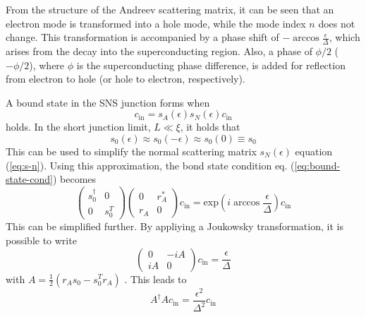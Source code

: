 From the structure of the Andreev scattering matrix, it can be seen that an electron mode is transformed into a hole mode, while the mode index $n$ does not change. This transformation is accompanied by a phase shift of $- \arccos \frac{\epsilon}{\Delta} $, which arises from the decay into the superconducting region. Also, a phase of $\phi/2$ ($-\phi/2$), where $\phi$ is the superconducting phase difference, is added for reflection from electron to hole (or hole to electron, respectively).

A bound state in the SNS junction forms when 
\begin{equation}
c_\text{in} = s_A ( \epsilon ) s_N ( \epsilon ) c_\text{in} \label{eq:bound-state-cond}
\end{equation}
holds. In the short junction limit, $L \ll \xi$, it holds that
\begin{equation}
s_0 ( \epsilon ) \approx s_0 ( - \epsilon ) \approx s_0 ( 0) \equiv s_0
\end{equation}
This can be used to simplify the normal scattering matrix $s_N (\epsilon) $ equation (\ref{eq:s-n}). Using this approximation, the bond state condition eq. (\ref{eq:bound-state-cond}) becomes
\begin{equation}
\begin{pmatrix} s_0^\dagger & 0\\ 0 & s_0^T \end{pmatrix}  \begin{pmatrix} 0 & r_A^* \\ r_A & 0 \end{pmatrix}  c_\text{in} = \text{exp} \left( i \arccos \frac{\epsilon}{\Delta} \right) c_\text{in}
\end{equation}
This can be simplified further. By appliying a Joukowsky transformation, it is possible to write
\begin{equation}
\begin{pmatrix} 0 & - i A \\ i A & 0 \end{pmatrix} c_\text{in} = \frac{\epsilon}{\Delta}
\end{equation}
with $A = \frac{1}{2} ( r_A s_0 - s_0^T r_A)$ . This leads  to
\begin{equation}
A^\dagger A c_\text{in} = \frac{\epsilon^2}{\Delta^2} c_\text{in} \label{eq:bound-state-final}
\end{equation}

